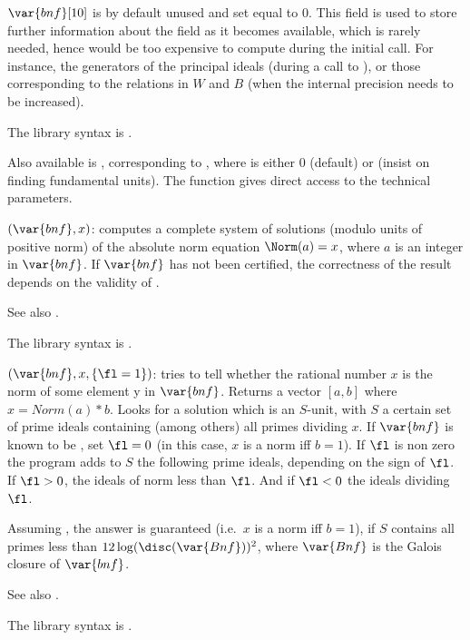 $\var{bnf}[10]$ is by default unused and set equal to 0. This field is used
to store further information about the field as it becomes available, which
is rarely needed, hence would be too expensive to compute during the initial
 call. For instance, the generators of the principal ideals
 (during a call to ), or
those corresponding to the relations in $W$ and $B$ (when the 
internal precision needs to be increased).

The library syntax is .

Also available is ,
corresponding to , where
 is either $0$ (default) or  (insist on finding
fundamental units). The function
 gives direct access to the technical parameters.

$(\var{bnf},x)$: \label{se:bnfisintnorm}computes a complete system of
solutions (modulo units of positive norm) of the absolute norm equation
$\Norm(a)=x$,
where $a$ is an integer in $\var{bnf}$. If $\var{bnf}$ has not been certified,
the correctness of the result depends on the validity of .

See also .

The library syntax is .

$(\var{bnf},x,\{\fl=1\})$: \label{se:bnfisnorm}tries to tell whether the
rational number $x$ is the norm of some element y in $\var{bnf}$. Returns a
vector $[a,b]$ where $x=Norm(a)*b$. Looks for a solution which is an $S$-unit,
with $S$ a certain set of prime ideals containing (among others) all primes
dividing $x$. If $\var{bnf}$ is known to be , set $\fl=0$ (in
this case, $x$ is a norm iff $b=1$). If $\fl$ is non zero the program adds to
$S$ the following prime ideals, depending on the sign of $\fl$. If $\fl>0$,
the ideals of norm less than $\fl$. And if $\fl<0$ the ideals dividing $\fl$.

Assuming , the answer is guaranteed (i.e.~$x$ is a norm iff $b=1$),
if $S$ contains all primes less than $12\log(\disc(\var{Bnf}))^2$, where
$\var{Bnf}$ is the Galois closure of $\var{bnf}$.

See also .

The library syntax is .


